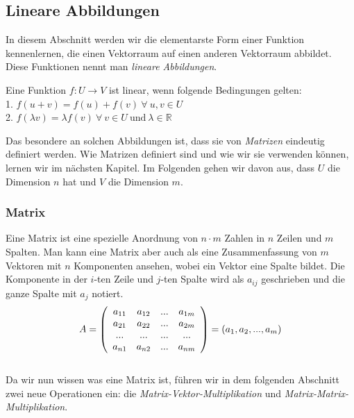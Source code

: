 \subsection{Lineare Abbildungen}
In diesem Abschnitt werden wir die elementarste Form einer Funktion kennenlernen, die einen Vektorraum auf einen anderen Vektorraum abbildet. Diese Funktionen nennt man \textit{lineare Abbildungen}.
\begin{Def}
	\label{Def:Def_1}
Eine Funktion $f:U \stackrel{}{\rightarrow} V$ ist linear, wenn folgende Bedingungen gelten: \\ 
1. $f(u+v) = f(u)+f(v) \ \forall \ u,v \in U$\\
2. $f(\lambda v) = \lambda f(v) \ \forall \ v \in U \ \text{und} \ \lambda \in \mathbb{R}$
\end{Def}

Das besondere an solchen Abbildungen ist, dass sie von \textit{Matrizen} eindeutig definiert werden. Wie Matrizen definiert sind und wie wir sie verwenden können, lernen wir im nächsten Kapitel. Im Folgenden gehen wir davon aus, dass $U$ die Dimension $n$ hat und $V$ die Dimension $m$. 

\subsubsection{Matrix}
Eine Matrix ist eine spezielle Anordnung von $n\cdot m$ Zahlen in $n$ Zeilen und $m$ Spalten. Man kann eine Matrix aber auch als eine Zusammenfassung von $m$ Vektoren mit $n$ Komponenten ansehen, wobei ein Vektor eine Spalte bildet. Die Komponente in der $i$-ten Zeile und $j$-ten Spalte wird als $a_{ij}$ geschrieben und die ganze Spalte mit $a_j$ notiert.\\
\begin{equation*}
A= \left(
   \begin{array}{cccc}
	  a_{11} & a_{12} & ... & a_{1m}\\
		a_{21} & a_{22} & ... & a_{2m}\\
		...   & ...   & ... & ...  \\
		a_{n1} & a_{n2} & ... & a_{nm}
	 \end{array}
	 \right) = (a_1, a_2, ..., a_m)\\
\end{equation*}
\\
Da wir nun wissen was eine Matrix ist, führen wir in dem folgenden Abschnitt zwei neue Operationen ein: die \textit{Matrix-Vektor-Multiplikation} und \textit{Matrix-Matrix-Multiplikation}.

